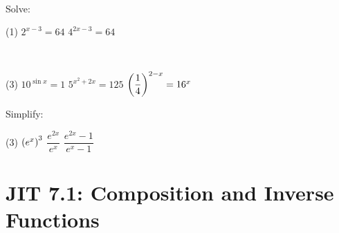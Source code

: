 \documentclass[mathNotesPreamble]{subfiles}
\begin{document}
  
  \pagebreak
  \begin{ex*}\ 
  
  \noindent
  \begin{minipage}[t]{0.625\linewidth}
    
    Solve:
    \begin{tasks}[after-item-skip=0.125\paperheight](1)
      \task $2^{x-3}=64$
      \task $4^{2x-3}=64$
    \end{tasks}
  \end{minipage}%
  \begin{minipage}[t]{0.375\linewidth}\ 
  
    \flushright
  \end{minipage}%
  \begin{tasks}[resume, after-item-skip=0.075\paperheight](3)
    \task $10^{\sin x}=1$
    \task $5^{x^2+2x}=125$
    \task ${\left(\dfrac{1}{4}\right)}^{2-x}=16^x$
  \end{tasks}
  \end{ex*}
  
  \begin{ex*}
    Simplify:
    \begin{tasks}(3)
      \task ${\left(e^x\right)}^3$
      \task $\dfrac{e^{2x}}{e^x}$
      \task $\dfrac{e^{2x}-1}{e^x-1}$
    \end{tasks}
  \end{ex*}
  
  \pagebreak
  
  \section{JIT 7.1: Composition and Inverse Functions}
  
\end{document}
